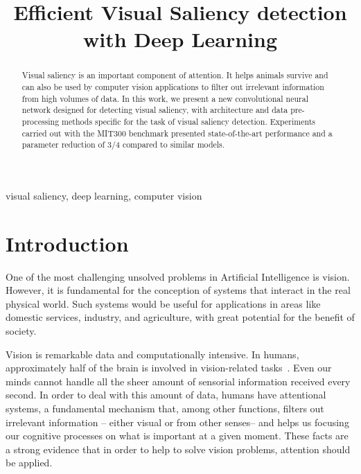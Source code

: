 \documentclass[conference]{IEEEtran}
\begin{document}
\title{Efficient Visual Saliency detection with Deep Learning\\
}

\author{
\and
{}
}

\maketitle

\begin{abstract}
Visual saliency is an important component of attention.
It helps animals survive and can also be used by computer vision applications
to filter out irrelevant information from high volumes of data.
In this work, we present a new convolutional neural network
designed for detecting visual saliency,
with architecture and data pre-processing methods specific
for the task of visual saliency detection.
Experiments carried out with the MIT300 benchmark presented state-of-the-art
performance and a parameter reduction of 3/4 compared to similar models.
\end{abstract}

\begin{IEEEkeywords}
visual saliency, deep learning, computer vision
\end{IEEEkeywords}

\section{Introduction}
One of the most challenging unsolved problems in Artificial Intelligence
is vision.
However, it is fundamental for the conception of systems that interact
in the real physical world.
Such systems would be useful for applications in areas like
domestic services, industry, and agriculture,
with great potential for the benefit of society.

Vision is remarkable data and computationally intensive.
In humans, approximately half of the brain is involved in
vision-related tasks~\cite{fixott_1957}.
Even our minds cannot handle all the sheer amount of sensorial information
received every second. In order to deal with this amount of data,
humans have attentional systems, a fundamental mechanism
that, among other functions, filters out irrelevant information
-- either visual or from other senses-- and helps us focusing our cognitive
processes on what is important at a given moment.
These facts are a strong evidence that in order to help to solve
vision problems, attention should be applied.
\end{document}
